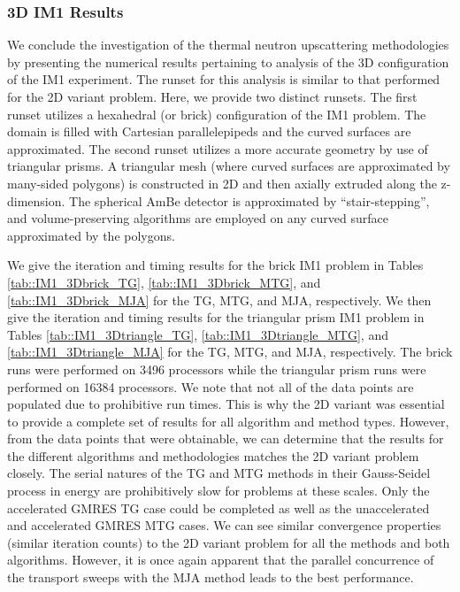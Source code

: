 \subsubsection{3D IM1 Results}
\label{sec::DSA_Results_IM1_3D}

We conclude the investigation of the thermal neutron upscattering methodologies by presenting the numerical results pertaining to analysis of the 3D configuration of the IM1 experiment. The runset for this analysis is similar to that performed for the 2D variant problem. Here, we provide two distinct runsets. The first runset utilizes a hexahedral (or brick) configuration of the IM1 problem. The domain is filled with Cartesian parallelepipeds and the curved surfaces are approximated. The second runset utilizes a more accurate geometry by use of triangular prisms. A triangular mesh (where curved surfaces are approximated by many-sided polygons) is constructed in 2D and then axially extruded along the z-dimension. The spherical AmBe detector is approximated by ``stair-stepping'', and volume-preserving algorithms are employed on any curved surface approximated by the polygons.

We give the iteration and timing results for the brick IM1 problem in Tables \ref{tab::IM1_3Dbrick_TG}, \ref{tab::IM1_3Dbrick_MTG}, and \ref{tab::IM1_3Dbrick_MJA} for the TG, MTG, and MJA, respectively. We then give the iteration and timing results for the triangular prism IM1 problem in Tables \ref{tab::IM1_3Dtriangle_TG}, \ref{tab::IM1_3Dtriangle_MTG}, and \ref{tab::IM1_3Dtriangle_MJA} for the TG, MTG, and MJA, respectively. The brick runs were performed on 3496 processors while the triangular prism runs were performed on 16384 processors. We note that not all of the data points are populated due to prohibitive run times. This is why the 2D variant was essential to provide a complete set of results for all algorithm and method types. However, from the data points that were obtainable, we can determine that the results for the different algorithms and methodologies matches the 2D variant problem closely. The serial natures of the TG and MTG methods in their Gauss-Seidel process in energy are prohibitively slow for problems at these scales. Only the accelerated GMRES TG case could be completed as well as the unaccelerated and accelerated GMRES MTG cases. We can see similar convergence properties (similar iteration counts) to the 2D variant problem for all the methods and both algorithms. However, it is once again apparent that the parallel concurrence of the transport sweeps with the MJA method leads to the best performance.

